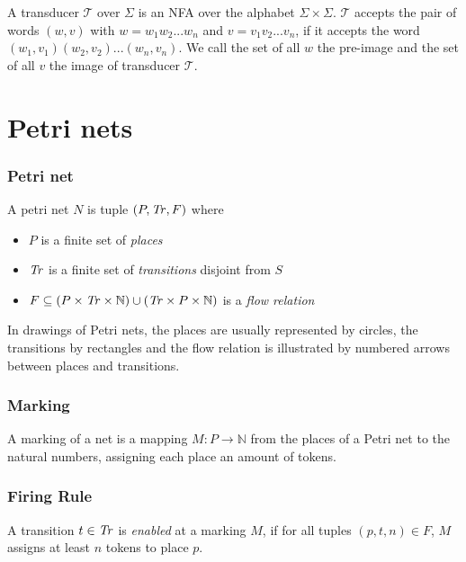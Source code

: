 A transducer $\mathcal{T}$ over $\Sigma$ is an NFA over the alphabet $\Sigma \times \Sigma$. $\mathcal{T}$ accepts the pair of words $(w,v)$ with $w = w_{1}w_{2}...w_{n}$ and $v=v_{1}v_{2}...v_{n}$, if it accepts the word $(w_{1},v_{1})(w_{2},v_{2})...(w_{n},v_{n})$.
We call the set of all $w$ the pre-image and the set of all $v$ the image of transducer $\mathcal{T}$.


\section{Petri nets}

\subsubsection{Petri net}

A petri net $N$ is tuple $(P,\mathit{Tr},F)$ where 
\begin{itemize}[-,noitemsep]
	\item $P$ is a finite set of \emph{places}
	\item $\mathit{Tr}$ is a finite set of \emph{transitions} disjoint from $S$
	\item $F \subseteq (P \times \mathit{Tr} \times \mathbb{N}) \cup (\mathit{Tr} \times P \times \mathbb{N})$ is a \emph{flow relation}
\end{itemize}

In drawings of Petri nets, the places are usually represented by circles, the transitions by rectangles and the flow relation is illustrated by numbered arrows between places and transitions.

\subsubsection{Marking}
A marking of a net is a mapping $M : P \rightarrow \mathbb{N}$ from the places of a Petri net to the natural numbers, assigning each place an amount of tokens.


\subsubsection{Firing Rule}
A transition $t \in \mathit{Tr}$ is \emph{enabled} at a marking $M$, if for all tuples $(p,t,n) \in F$, $M$ assigns at least $n$ tokens to place $p$.


